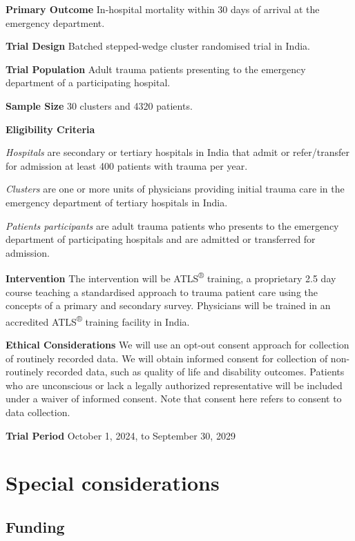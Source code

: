 \documentclass[
]{scrartcl}
\begin{document}
\textbf{Primary Outcome} In-hospital mortality within 30 days of arrival
at the emergency department.

\textbf{Trial Design} Batched stepped-wedge cluster randomised trial in
India.

\textbf{Trial Population} Adult trauma patients presenting to the
emergency department of a participating hospital.

\textbf{Sample Size} 30 clusters and 4320 patients.

\textbf{Eligibility Criteria}

\emph{Hospitals} are secondary or tertiary hospitals in India that admit
or refer/transfer for admission at least 400 patients with trauma per
year.

\emph{Clusters} are one or more units of physicians providing initial
trauma care in the emergency department of tertiary hospitals in India.

\emph{Patients participants} are adult trauma patients who presents to
the emergency department of participating hospitals and are admitted or
transferred for admission.

\textbf{Intervention} The intervention will be ATLS\textsuperscript{®}
training, a proprietary 2.5 day course teaching a standardised approach
to trauma patient care using the concepts of a primary and secondary
survey. Physicians will be trained in an accredited
ATLS\textsuperscript{®} training facility in India.

\textbf{Ethical Considerations} We will use an opt-out consent approach
for collection of routinely recorded data. We will obtain informed
consent for collection of non-routinely recorded data, such as quality
of life and disability outcomes. Patients who are unconscious or lack a
legally authorized representative will be included under a waiver of
informed consent. Note that consent here refers to consent to data
collection.

\textbf{Trial Period} October 1, 2024, to September 30, 2029

\newpage{}

\hypertarget{special-considerations}{%
\section{Special considerations}\label{special-considerations}}

\hypertarget{funding}{%
\subsection{Funding}\label{funding}}
\end{document}

